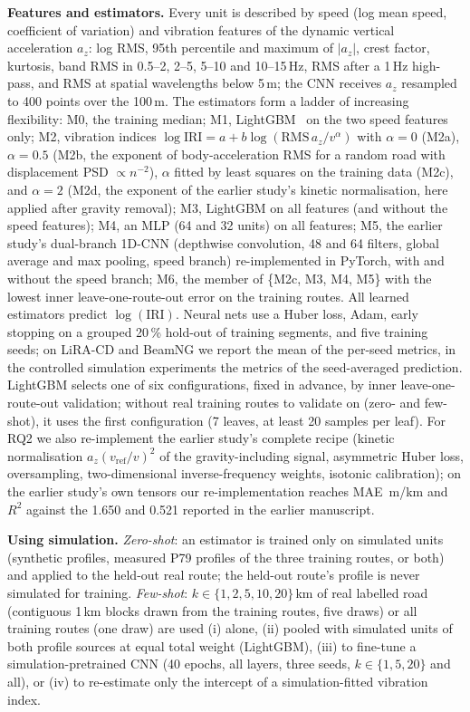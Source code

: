 \textbf{Features and estimators.}
Every unit is described by speed (log mean speed, coefficient of variation) and vibration features of the dynamic vertical acceleration $a_z$: log RMS, 95th percentile and maximum of $|a_z|$, crest factor, kurtosis, band RMS in 0.5--2, 2--5, 5--10 and 10--15\,Hz, RMS after a 1\,Hz high-pass, and RMS at spatial wavelengths below 5\,m; the CNN receives $a_z$ resampled to 400 points over the 100\,m.
The estimators form a ladder of increasing flexibility:
M0, the training median;
M1, LightGBM~\cite{ke2017lightgbm} on the two speed features only;
M2, vibration indices $\log \mathrm{IRI} = a + b \log(\mathrm{RMS}\,a_z / v^{\alpha})$ with $\alpha = 0$ (M2a), $\alpha = 0.5$ (M2b, the exponent of body-acceleration RMS for a random road with displacement PSD $\propto n^{-2}$), $\alpha$ fitted by least squares on the training data (M2c), and $\alpha = 2$ (M2d, the exponent of the earlier study's kinetic normalisation, here applied after gravity removal);
M3, LightGBM on all features (and without the speed features);
M4, an MLP (64 and 32 units) on all features;
M5, the earlier study's dual-branch 1D-CNN (depthwise convolution, 48 and 64 filters, global average and max pooling, speed branch) re-implemented in PyTorch, with and without the speed branch;
M6, the member of \{M2c, M3, M4, M5\} with the lowest inner leave-one-route-out error on the training routes.
All learned estimators predict $\log(\mathrm{IRI})$.
Neural nets use a Huber loss, Adam, early stopping on a grouped 20\,\% hold-out of training segments, and five training seeds; on LiRA-CD and BeamNG we report the mean of the per-seed metrics, in the controlled simulation experiments the metrics of the seed-averaged prediction.
LightGBM selects one of six configurations, fixed in advance, by inner leave-one-route-out validation; without real training routes to validate on (zero- and few-shot), it uses the first configuration (7 leaves, at least 20 samples per leaf).
For RQ2 we also re-implement the earlier study's complete recipe (kinetic normalisation $a_z (v_{\mathrm{ref}}/v)^2$ of the gravity-including signal, asymmetric Huber loss, oversampling, two-dimensional inverse-frequency weights, isotonic calibration); on the earlier study's own tensors our re-implementation reaches MAE \legacyFidMae{}\,m/km and $R^2$ \legacyFidRtwo{} against the 1.650 and 0.521 reported in the earlier manuscript.

\textbf{Using simulation.}
\emph{Zero-shot}: an estimator is trained only on simulated units (synthetic profiles, measured P79 profiles of the three training routes, or both) and applied to the held-out real route; the held-out route's profile is never simulated for training.
\emph{Few-shot}: $k \in \{1,2,5,10,20\}$\,km of real labelled road (contiguous 1\,km blocks drawn from the training routes, five draws) or all training routes (one draw) are used (i) alone, (ii) pooled with simulated units of both profile sources at equal total weight (LightGBM), (iii) to fine-tune a simulation-pretrained CNN (40 epochs, all layers, three seeds, $k \in \{1,5,20\}$ and all), or (iv) to re-estimate only the intercept of a simulation-fitted vibration index.
